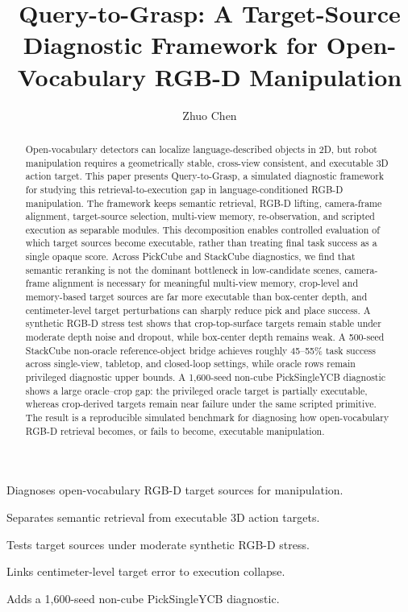 \documentclass[preprint,12pt]{elsarticle}
\begin{document}
\begin{frontmatter}

\title{Query-to-Grasp: A Target-Source Diagnostic Framework for Open-Vocabulary RGB-D Manipulation}

\author[chalmers]{Zhuo Chen}

\begin{abstract}
Open-vocabulary detectors can localize language-described objects in 2D, but
robot manipulation requires a geometrically stable, cross-view consistent, and
executable 3D action target. This paper presents Query-to-Grasp, a simulated
diagnostic framework for studying this retrieval-to-execution gap in
language-conditioned RGB-D manipulation. The framework keeps semantic
retrieval, RGB-D lifting, camera-frame alignment, target-source selection,
multi-view memory, re-observation, and scripted execution as separable modules.
This decomposition enables controlled evaluation of which target sources become
executable, rather than treating final task success as a single opaque score.
Across PickCube and StackCube diagnostics, we find that semantic reranking is
not the dominant bottleneck in low-candidate scenes, camera-frame alignment is
necessary for meaningful multi-view memory, crop-level and memory-based target
sources are far more executable than box-center depth, and centimeter-level
target perturbations can sharply reduce pick and place success. A synthetic
RGB-D stress test shows that crop-top-surface targets remain stable under
moderate depth noise and dropout, while box-center depth remains weak. A
500-seed StackCube non-oracle reference-object bridge achieves roughly
45--55\% task success across single-view, tabletop, and closed-loop settings,
while oracle rows remain privileged diagnostic upper bounds. A 1,600-seed
non-cube PickSingleYCB diagnostic shows a large oracle--crop gap: the
privileged oracle target is partially executable, whereas crop-derived targets
remain near failure under the same scripted primitive. The
result is a reproducible simulated benchmark for diagnosing how open-vocabulary
RGB-D retrieval becomes, or fails to become, executable manipulation.
\end{abstract}

\begin{highlights}
\item Diagnoses open-vocabulary RGB-D target sources for manipulation.
\item Separates semantic retrieval from executable 3D action targets.
\item Tests target sources under moderate synthetic RGB-D stress.
\item Links centimeter-level target error to execution collapse.
\item Adds a 1,600-seed non-cube PickSingleYCB diagnostic.
\end{highlights}


\end{frontmatter}
\end{document}
